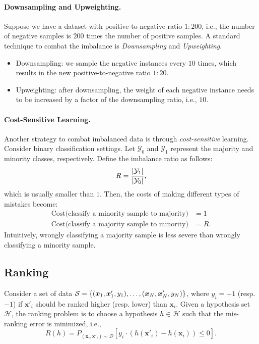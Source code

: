     \paragraph{Downsampling and Upweighting.}
    Suppose we have a dataset with positive-to-negative ratio $1:200$, i.e., the number of negative samples is $200$ times the number of positive samples.
    A standard technique to combat the imbalance is \emph{Downsampling} and \emph{Upweighting}.
        \begin{itemize}
            \item Downsampling: we sample the negative instances every $10$ times, which results in the new positive-to-negative ratio $1:20$.
            \item Upweighting: after downsampling, the weight of each negative instance needs to be increased by a factor of the downsampling ratio, i.e., $10$.
        \end{itemize}
        
    \paragraph{Cost-Sensitive Learning.}
    Another strategy to combat imbalanced data is through \emph{cost-sensitive} learning.
    Consider binary classification settings.
    Let $\mathcal{Y}_0$ and $\mathcal{Y}_1$ represent the majority and minority classes, respectively. 
    Define the imbalance ratio as follows:
        \begin{equation}
            R = \frac{| \mathcal{Y}_1 |}{| \mathcal{Y}_0 |},
        \end{equation}
    which is usually smaller than $1$. 
    Then, the costs of making different types of mistakes become:
        \begin{equation}
            \begin{aligned}
                    \text{Cost(classify a minority sample to majority)} & = 1 \\
                    \text{Cost(classify a majority sample to minority)} & = R.
            \end{aligned}
        \end{equation}
    Intuitively, wrongly classifying a majority sample is less severe than wrongly classifying a minority sample.
        

\subsection{Ranking}
    Consider a set of data $\mathcal{S}=\{ (\bm{x}_1, \bm{x}'_1, y_1), \ldots, (\bm{x}_{N}, \bm{x}'_{N}, y_{N}) \}$, where $y_i=+1$ (resp. $-1$) if $\bm{x}'_i$ should be ranked higher (resp. lower) than $\bm{x}_i$.
    Given a hypothesis set $\mathcal{H}$, the ranking problem is to choose a hypothesis $h \in \mathcal{H}$ such that the mis-ranking error is minimized, i.e.,
        \begin{equation}
            R(h) = P_{(\bm{x}_i, \bm{x}'_i) \sim \mathcal{D}}\left[ y_i \cdot \left( h(\bm{x}'_i) - h(\bm{x}_i) \right) \le 0 \right].
        \end{equation}
    

